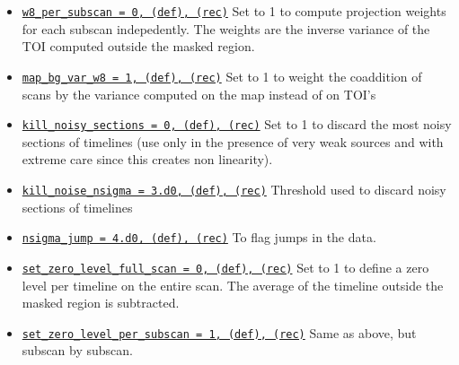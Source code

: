 \documentclass[a4paper,10pt]{article}
\begin{document}
\begin{itemize}
\item \underline{\tt w8\_per\_subscan = 0, (def), (rec)} Set to 1 to compute
  projection weights for each subscan indepedently. The weights are the inverse
  variance of the TOI computed outside the masked region.
\item \underline{\tt map\_bg\_var\_w8 = 1, (def), (rec)}  Set to 1 to weight the coaddition of scans by the variance computed on the map instead of on TOI's
\item \underline{\tt kill\_noisy\_sections = 0, (def), (rec)} Set to 1 to discard
  the most noisy sections of timelines (use only in the presence of very weak
  sources and with extreme care since this creates non linearity).
\item \underline{\tt kill\_noise\_nsigma = 3.d0, (def), (rec)} Threshold used to discard noisy sections of timelines
\item \underline{\tt nsigma\_jump = 4.d0, (def), (rec)} To flag jumps in the data.

\item \underline{\tt set\_zero\_level\_full\_scan = 0, (def), (rec)} Set to 1 to
  define a zero level per timeline on the entire scan. The average of the
  timeline outside the masked region is subtracted.
\item \underline{\tt set\_zero\_level\_per\_subscan = 1, (def), (rec)} Same as
  above, but subscan by subscan.


\end{itemize}
\end{document}
